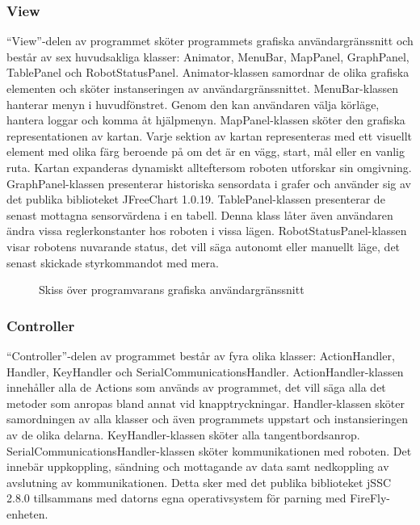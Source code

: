 \documentclass[11pt]{article}
\begin{document}
\begin{flushleft}
\subsubsection{View}
``View''-delen av programmet sköter programmets grafiska användargränssnitt och består av sex huvudsakliga klasser: Animator, MenuBar, MapPanel, GraphPanel, TablePanel och RobotStatusPanel. Animator-klassen samordnar de olika grafiska elementen och sköter instanseringen av användargränssnittet. 
MenuBar-klassen hanterar menyn i huvudfönstret. Genom den kan användaren välja körläge, hantera loggar och komma åt hjälpmenyn. 
MapPanel-klassen sköter den grafiska representationen av kartan. Varje sektion av kartan representeras med ett visuellt element med olika färg beroende på om det är en vägg, start, mål eller en vanlig ruta. Kartan expanderas dynamiskt allteftersom roboten utforskar sin omgivning. 
GraphPanel-klassen presenterar historiska sensordata i grafer och använder sig av det publika biblioteket JFreeChart 1.0.19. 
TablePanel-klassen presenterar de senast mottagna sensorvärdena i en tabell. Denna klass låter även användaren ändra vissa reglerkonstanter hos roboten i vissa lägen.
RobotStatusPanel-klassen visar robotens nuvarande status, det vill säga autonomt eller manuellt läge, det senast skickade styrkommandot med mera.

\begin{figure}[H]
\centering
\noindent\resizebox{.8\linewidth}{!}{
	}
	\caption{Skiss över programvarans grafiska användargränssnitt\label{software}}	
\end{figure}

\subsubsection{Controller}
``Controller''-delen av programmet består av fyra olika klasser: ActionHandler, Handler, KeyHandler och SerialCommunicationsHandler. 
ActionHandler-klassen innehåller alla de Actions som används av programmet, det vill säga alla det metoder som anropas bland annat vid knapptryckningar.
Handler-klassen sköter samordningen av alla klasser och även programmets uppstart och instansieringen av de olika delarna.
KeyHandler-klassen sköter alla tangentbordsanrop.
SerialCommunicationsHandler-klassen sköter kommunikationen med roboten. Det innebär uppkoppling, sändning och mottagande av data samt nedkoppling av avslutning av kommunikationen. Detta sker med det publika biblioteket jSSC 2.8.0 tillsammans med datorns egna operativsystem för parning med FireFly-enheten.


\end{flushleft}
\end{document}
